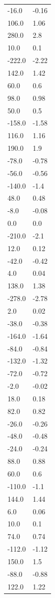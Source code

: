 \begin{longtable}{ll}
-16.0 & -0.16 \\
106.0 & 1.06 \\
280.0 & 2.8 \\
10.0 & 0.1 \\
-222.0 & -2.22 \\
142.0 & 1.42 \\
60.0 & 0.6 \\
98.0 & 0.98 \\
50.0 & 0.5 \\
-158.0 & -1.58 \\
116.0 & 1.16 \\
190.0 & 1.9 \\
-78.0 & -0.78 \\
-56.0 & -0.56 \\
-140.0 & -1.4 \\
48.0 & 0.48 \\
-8.0 & -0.08 \\
0.0 & 0.0 \\
-210.0 & -2.1 \\
12.0 & 0.12 \\
-42.0 & -0.42 \\
4.0 & 0.04 \\
138.0 & 1.38 \\
-278.0 & -2.78 \\
2.0 & 0.02 \\
-38.0 & -0.38 \\
-164.0 & -1.64 \\
-84.0 & -0.84 \\
-132.0 & -1.32 \\
-72.0 & -0.72 \\
-2.0 & -0.02 \\
18.0 & 0.18 \\
82.0 & 0.82 \\
-26.0 & -0.26 \\
-48.0 & -0.48 \\
-24.0 & -0.24 \\
88.0 & 0.88 \\
60.0 & 0.6 \\
-110.0 & -1.1 \\
144.0 & 1.44 \\
6.0 & 0.06 \\
10.0 & 0.1 \\
74.0 & 0.74 \\
-112.0 & -1.12 \\
150.0 & 1.5 \\
-88.0 & -0.88 \\
122.0 & 1.22 \\

\end{longtable}
